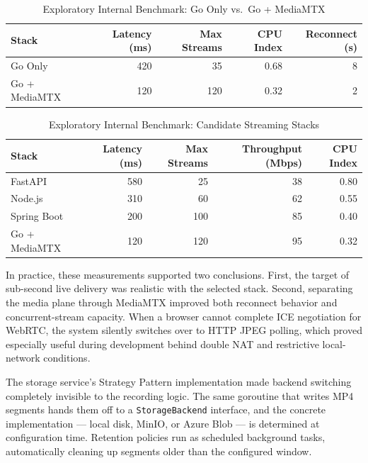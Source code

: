 \documentclass[12pt,a4paper,oneside]{report}
\begin{document}
\begin{table}[!htbp]
\centering
\small
\begin{tabular}{|p{3.1cm}|r|r|r|r|}
\hline
\textbf{Stack} & \textbf{Latency (ms)} & \textbf{Max Streams} & \textbf{CPU Index} & \textbf{Reconnect (s)} \\
\hline
Go Only & 420 & 35 & 0.68 & 8 \\
\hline
Go + MediaMTX & 120 & 120 & 0.32 & 2 \\
\hline
\end{tabular}
\caption{Exploratory Internal Benchmark: Go Only vs.\ Go + MediaMTX}
\label{tab:s1_go_mediamtx_benchmark}
\end{table}

\begin{table}[!htbp]
\centering
\small
\begin{tabular}{|p{3.1cm}|r|r|r|r|}
\hline
\textbf{Stack} & \textbf{Latency (ms)} & \textbf{Max Streams} & \textbf{Throughput (Mbps)} & \textbf{CPU Index} \\
\hline
FastAPI & 580 & 25 & 38 & 0.80 \\
\hline
Node.js & 310 & 60 & 62 & 0.55 \\
\hline
Spring Boot & 200 & 100 & 85 & 0.40 \\
\hline
Go + MediaMTX & 120 & 120 & 95 & 0.32 \\
\hline
\end{tabular}
\caption{Exploratory Internal Benchmark: Candidate Streaming Stacks}
\label{tab:s1_streaming_stack_benchmark}
\end{table}

\hspace{0.8cm}In practice, these measurements supported two conclusions. First, the target of sub-second live delivery was realistic with the selected stack. Second, separating the media plane through MediaMTX improved both reconnect behavior and concurrent-stream capacity. When a browser cannot complete ICE negotiation for WebRTC, the system silently switches over to HTTP JPEG polling, which proved especially useful during development behind double NAT and restrictive local-network conditions.

\hspace{0.8cm}The storage service's Strategy Pattern implementation made backend switching completely invisible to the recording logic. The same goroutine that writes MP4 segments hands them off to a \texttt{StorageBackend} interface, and the concrete implementation --- local disk, MinIO, or Azure Blob --- is determined at configuration time. Retention policies run as scheduled background tasks, automatically cleaning up segments older than the configured window.
\end{document}
